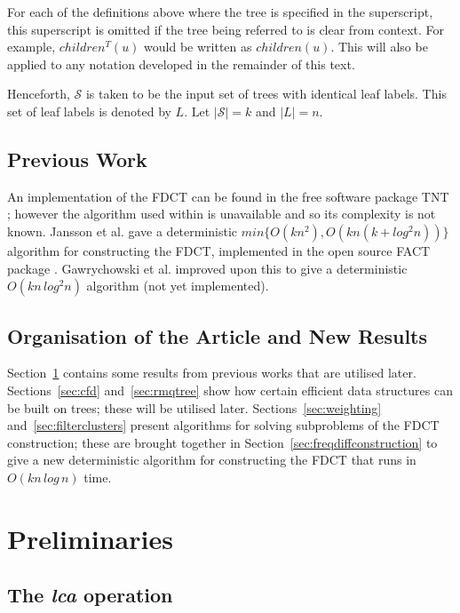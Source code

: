 \documentclass{article}
\begin{document}
    For each of the definitions above where the tree is specified in the superscript, this superscript is omitted if the tree being referred to is clear from context. For example, $children^T(u)$ would be written as $children(u)$. This will also be applied to any notation developed in the remainder of this text.

    Henceforth, $\mathcal{S}$ is taken to be the input set of trees with identical leaf labels. This set of leaf labels is denoted by $L$. Let $|\mathcal{S}| = k$ and $|L| = n$.

    \subsection{Previous Work}
    \label{subsec:previouswork}

    An implementation of the FDCT can be found in the free software package TNT \cite{goloboff2008tnt}; however the algorithm used within is unavailable and so its complexity is not known. Jansson et al. \cite{jansson2018algorithms} gave a deterministic $min\{O(kn^2), O(kn(k + log^2 n))\}$ algorithm for constructing the FDCT, implemented in the open source FACT package \cite{jansson2016improved}. Gawrychowski et al. \cite{gawrychowski2017faster} improved upon this to give a deterministic $O(kn\,log^2n)$ algorithm (not yet implemented).

    \subsection{Organisation of the Article and New Results}
    Section~\ref{sec:preliminaries} contains some results from previous works that are utilised later. Sections~\ref{sec:cfd} and~\ref{sec:rmqtree} show how certain efficient data structures can be built on trees; these will be utilised later. Sections~\ref{sec:weighting} and~\ref{sec:filterclusters} present algorithms for solving subproblems of the FDCT construction; these are brought together in Section~\ref{sec:freqdiffconstruction} to give a new deterministic algorithm for constructing the FDCT that runs in $O(kn\,log\,n)$ time.

    \section{Preliminaries}
    \label{sec:preliminaries}

    \subsection{The \textit{lca} operation}
\end{document}
